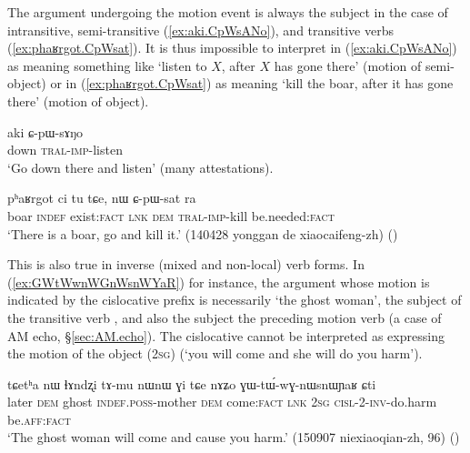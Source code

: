 The argument undergoing the motion event is always the subject in the case of intransitive, semi-transitive (\ref{ex:aki.CpWsANo}), and transitive verbs (\ref{ex:phaʁrgot.CpWsat}). It is thus impossible to interpret  in (\ref{ex:aki.CpWsANo}) as meaning something like `listen to $X$, after $X$ has gone there' (motion of semi-object) or  in (\ref{ex:phaʁrgot.CpWsat}) as meaning `kill the boar, after it has gone there' (motion of object).
 
\begin{exe}
\ex  \label{ex:aki.CpWsANo}
 \gll aki ɕ-pɯ-sɤŋo \\
 down \textsc{tral}-\textsc{imp}-listen \\
\glt `Go down there and listen' (many attestations).
\end{exe}

\begin{exe}
\ex  \label{ex:phaʁrgot.CpWsat}
 \gll pʰaʁrgot ci tu tɕe, nɯ ɕ-pɯ-sat ra \\
boar \textsc{indef} exist:\textsc{fact} \textsc{lnk} \textsc{dem} \textsc{tral}-\textsc{imp}-kill be.needed:\textsc{fact} \\
\glt `There is a boar, go and kill it.' (140428 yonggan de xiaocaifeng-zh) ()
\end{exe}

This is also true in inverse (mixed and non-local) verb forms. In (\ref{ex:GWtWwnWGnWsnWYaR}) for instance, the argument whose motion is indicated by the cislocative prefix is necessarily  `the ghost woman', the subject of the transitive verb , and also the subject the preceding motion verb  (a case of AM echo, §\ref{sec:AM.echo}). The cislocative  cannot be interpreted as expressing the motion of the object (\textsc{2sg}) (`you will come and she will do you harm'). 

\begin{exe}
\ex  \label{ex:GWtWwnWGnWsnWYaR}
 \gll  tɕetʰa nɯ ɬɤndʐi tɤ-mu nɯnɯ ɣi tɕe nɤʑo ɣɯ-tɯ́-wɣ-nɯsnɯɲaʁ ɕti \\
 later \textsc{dem} ghost \textsc{indef}.\textsc{poss}-mother \textsc{dem} come:\textsc{fact} \textsc{lnk} \textsc{2sg} \textsc{cisl}-2-\textsc{inv}-do.harm be.\textsc{aff}:\textsc{fact} \\
\glt `The ghost woman will come and cause you harm.' (150907 niexiaoqian-zh, 96)
()
\end{exe}

